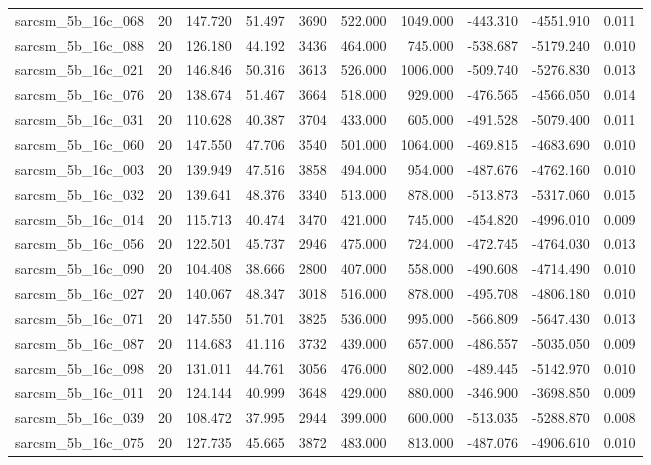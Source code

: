 \begin{tabular}{lrrrrrrrrr}
sarcsm\_5b\_16c\_068 & 20 & 147.720 & 51.497 & 3690 & 522.000 & 1049.000 & -443.310 & -4551.910 & 0.011 \\
sarcsm\_5b\_16c\_088 & 20 & 126.180 & 44.192 & 3436 & 464.000 & 745.000 & -538.687 & -5179.240 & 0.010 \\
sarcsm\_5b\_16c\_021 & 20 & 146.846 & 50.316 & 3613 & 526.000 & 1006.000 & -509.740 & -5276.830 & 0.013 \\
sarcsm\_5b\_16c\_076 & 20 & 138.674 & 51.467 & 3664 & 518.000 & 929.000 & -476.565 & -4566.050 & 0.014 \\
sarcsm\_5b\_16c\_031 & 20 & 110.628 & 40.387 & 3704 & 433.000 & 605.000 & -491.528 & -5079.400 & 0.011 \\
sarcsm\_5b\_16c\_060 & 20 & 147.550 & 47.706 & 3540 & 501.000 & 1064.000 & -469.815 & -4683.690 & 0.010 \\
sarcsm\_5b\_16c\_003 & 20 & 139.949 & 47.516 & 3858 & 494.000 & 954.000 & -487.676 & -4762.160 & 0.010 \\
sarcsm\_5b\_16c\_032 & 20 & 139.641 & 48.376 & 3340 & 513.000 & 878.000 & -513.873 & -5317.060 & 0.015 \\
sarcsm\_5b\_16c\_014 & 20 & 115.713 & 40.474 & 3470 & 421.000 & 745.000 & -454.820 & -4996.010 & 0.009 \\
sarcsm\_5b\_16c\_056 & 20 & 122.501 & 45.737 & 2946 & 475.000 & 724.000 & -472.745 & -4764.030 & 0.013 \\
sarcsm\_5b\_16c\_090 & 20 & 104.408 & 38.666 & 2800 & 407.000 & 558.000 & -490.608 & -4714.490 & 0.010 \\
sarcsm\_5b\_16c\_027 & 20 & 140.067 & 48.347 & 3018 & 516.000 & 878.000 & -495.708 & -4806.180 & 0.010 \\
sarcsm\_5b\_16c\_071 & 20 & 147.550 & 51.701 & 3825 & 536.000 & 995.000 & -566.809 & -5647.430 & 0.013 \\
sarcsm\_5b\_16c\_087 & 20 & 114.683 & 41.116 & 3732 & 439.000 & 657.000 & -486.557 & -5035.050 & 0.009 \\
sarcsm\_5b\_16c\_098 & 20 & 131.011 & 44.761 & 3056 & 476.000 & 802.000 & -489.445 & -5142.970 & 0.010 \\
sarcsm\_5b\_16c\_011 & 20 & 124.144 & 40.999 & 3648 & 429.000 & 880.000 & -346.900 & -3698.850 & 0.009 \\
sarcsm\_5b\_16c\_039 & 20 & 108.472 & 37.995 & 2944 & 399.000 & 600.000 & -513.035 & -5288.870 & 0.008 \\
sarcsm\_5b\_16c\_075 & 20 & 127.735 & 45.665 & 3872 & 483.000 & 813.000 & -487.076 & -4906.610 & 0.010 \\

\end{tabular}
